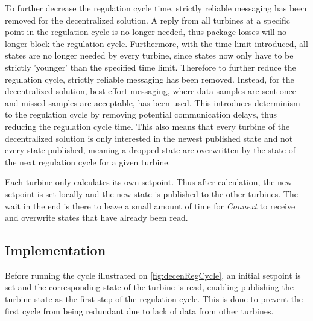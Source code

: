 To further decrease the regulation cycle time, strictly reliable messaging has been removed for the decentralized solution. A reply from all turbines at a specific point in the regulation cycle is no longer needed, thus package losses will no longer block the regulation cycle. Furthermore, with the time limit introduced, all states are no longer needed by every turbine, since states now only have to be strictly 'younger' than the specified time limit. Therefore to further reduce the regulation cycle, strictly reliable messaging has been removed. Instead, for the decentralized solution, best effort messaging, where data samples are sent once and missed samples are acceptable, has been used. This introduces determinism to the regulation cycle by removing potential communication delays, thus reducing the regulation cycle time. This also means that every turbine of the decentralized solution is only interested in the newest published state and not every state published, meaning a dropped state are overwritten by the state of the next regulation cycle for a given turbine.

Each turbine only calculates its own setpoint. Thus after calculation, the new setpoint is set locally and the new state is published to the other turbines. The wait in the end is there to leave a small amount of time for \textit{Connext} to receive and overwrite states that have already been read.

\subsection{Implementation}

Before running the cycle illustrated on \cref{fig:decenRegCycle}, an initial setpoint is set and the corresponding state of the turbine is read, enabling publishing the turbine state as the first step of the regulation cycle. This is done to prevent the first cycle from being redundant due to lack of data from other turbines. 

